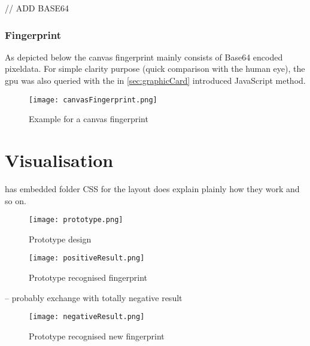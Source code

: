 // ADD BASE64

\subsubsection{Fingerprint}
As depicted below the canvas fingerprint mainly consists of Base64 encoded pixeldata. For simple clarity purpose (quick comparison with the human eye), the gpu was also queried with the in \autoref{sec:graphicCard} introduced JavaScript method.\\

\begin{figure}[H]
	\centering
	\texttt{[image: canvasFingerprint.png]}
	\caption{Example for a canvas fingerprint\\}
	\label{fig:canvasFP}
\end{figure}

\section{Visualisation}


has embedded folder CSS for the layout
does explain plainly how they work and so on.

\begin{figure}[H]
	\centering
	\texttt{[image: prototype.png]}
	\caption{Prototype design\\}
	\label{PrototypeDesign}
\end{figure}

\begin{figure}[H]
	\centering
	\texttt{[image: positiveResult.png]}
	\caption{Prototype recognised fingerprint\\}
	\label{PositivePrototypeResult}
\end{figure}

-- probably exchange with totally negative result
\begin{figure}[H]
	\centering
	\texttt{[image: negativeResult.png]}
	\caption{Prototype recognised new fingerprint\\}
	\label{NegativePrototypeResult}
\end{figure}